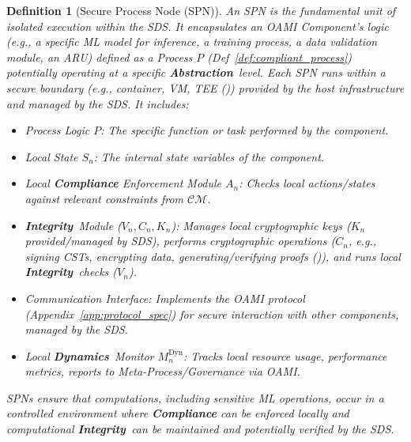 \documentclass[12pt,a4paper]{report}
\renewcommand{\citep}[1]{\textit{\scriptsize{(\cite{#1})}}}
\newtheorem{definition}{Definition}[section]
\newcommand{\Integrity}{\textbf{Integrity}}
\newcommand{\Abstraction}{\textbf{Abstraction}}
\newcommand{\Dynamics}{\textbf{Dynamics}}
\begin{document}
	\begin{definition}[Secure Process Node (SPN)]
		\label{def:spn}
		An SPN is the fundamental unit of isolated execution within the SDS. It encapsulates an OAMI Component's logic (e.g., a specific ML model for inference, a training process, a data validation module, an ARU) defined as a Process $P$ (Def~\ref{def:compliant_process}) potentially operating at a specific \Abstraction\ level. Each SPN runs within a secure boundary (e.g., container, VM, TEE \citep{Citadel_PlusPlus_2025}) provided by the host infrastructure and managed by the SDS. It includes:
		\begin{itemize}[noitemsep]
			\item Process Logic $P$: The specific function or task performed by the component.
			\item Local State $S_n$: The internal state variables of the component.
			\item Local \textbf{Compliance} Enforcement Module $A_n$: Checks local actions/states against relevant constraints from $\mathcal{CM}$.
			\item \Integrity\ Module ($V_n, C_n, K_n$): Manages local cryptographic keys ($K_n$ provided/managed by SDS), performs cryptographic operations ($C_n$, e.g., signing CSTs, encrypting data, generating/verifying proofs \citep{Peng2025ZKMLSurvey}), and runs local \Integrity\ checks ($V_n$).
			\item Communication Interface: Implements the OAMI protocol (Appendix~\ref{app:protocol_spec}) for secure interaction with other components, managed by the SDS.
			\item Local \Dynamics\ Monitor $M_n^{\text{Dyn}}$: Tracks local resource usage, performance metrics, reports to Meta-Process/Governance via OAMI.
		\end{itemize}
		SPNs ensure that computations, including sensitive ML operations, occur in a controlled environment where \textbf{Compliance} can be enforced locally and computational \Integrity\ can be maintained and potentially verified by the SDS.
	\end{definition}
	
\end{document}
